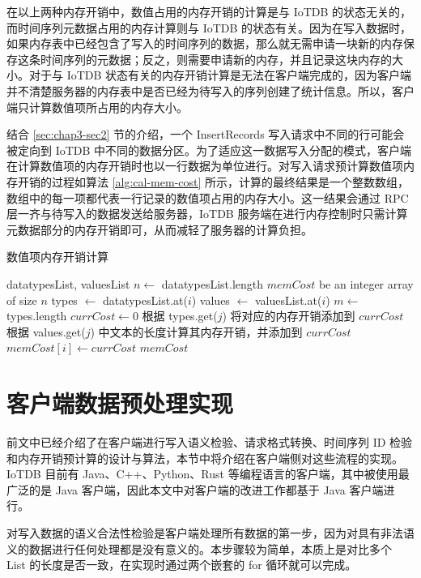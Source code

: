 在以上两种内存开销中，数值占用的内存开销的计算是与 IoTDB 的状态无关的，而时间序列元数据占用的内存计算则与 IoTDB 的状态有关。因为在写入数据时，如果内存表中已经包含了写入的时间序列的数据，那么就无需申请一块新的内存保存这条时间序列的元数据；反之，则需要申请新的内存，并且记录这块内存的大小。对于与 IoTDB 状态有关的内存开销计算是无法在客户端完成的，因为客户端并不清楚服务器的内存表中是否已经为待写入的序列创建了统计信息。所以，客户端只计算数值项所占用的内存大小。

结合 \ref{sec:chap3-sec2} 节的介绍，一个 InsertRecords 写入请求中不同的行可能会被定向到 IoTDB 中不同的数据分区。为了适应这一数据写入分配的模式，客户端在计算数值项的内存开销时也以一行数据为单位进行。对写入请求预计算数值项内存开销的过程如算法 \ref{alg:cal-mem-cost} 所示，计算的最终结果是一个整数数组，数组中的每一项都代表一行记录的数值项占用的内存大小。这一结果会通过 RPC 层一齐与待写入的数据发送给服务器，IoTDB 服务端在进行内存控制时只需计算元数据部分的内存开销即可，从而减轻了服务器的计算负担。

\begin{algorithm}
  \caption{数值项内存开销计算}
  \label{alg:cal-mem-cost}
  \small
  \begin{algorithmic}
    \REQUIRE datatypesList, valuesList
    \STATE $n \leftarrow$ datatypesList.length
    \STATE $memCost$ be an integer array of size $n$
      \STATE types $\leftarrow$ datatypesList.at($i$)
      \STATE values $\leftarrow$ valuesList.at($i$)
      \STATE $m \leftarrow$ types.length
      \STATE $currCost \leftarrow 0$
        \STATE 根据 types.get($j$) 将对应的内存开销添加到 $currCost$
          \STATE 根据 values.get($j$) 中文本的长度计算其内存开销，并添加到 $currCost$
        \ENDIF 
      \ENDFOR
      \STATE $memCost[i] \leftarrow currCost$
    \ENDFOR
    \RETURN $memCost$
  \end{algorithmic}
\end{algorithm}

\section{客户端数据预处理实现}
前文中已经介绍了在客户端进行写入语义检验、请求格式转换、时间序列 ID 检验和内存开销预计算的设计与算法，本节中将介绍在客户端侧对这些流程的实现。IoTDB 目前有 Java、C++、Python、Rust 等编程语言的客户端，其中被使用最广泛的是 Java 客户端，因此本文中对客户端的改进工作都基于 Java 客户端进行。

对写入数据的语义合法性检验是客户端处理所有数据的第一步，因为对具有非法语义的数据进行任何处理都是没有意义的。本步骤较为简单，本质上是对比多个 List 的长度是否一致，在实现时通过两个嵌套的 for 循环就可以完成。

